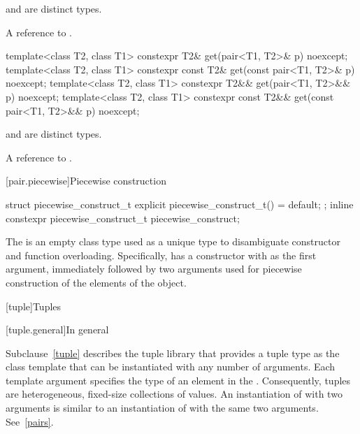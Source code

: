 \begin{itemdescr}
\pnum
\mandates
{} and  are distinct types.

\pnum
\returns
A reference to .
\end{itemdescr}

%
\begin{itemdecl}
template<class T2, class T1>
  constexpr T2& get(pair<T1, T2>& p) noexcept;
template<class T2, class T1>
  constexpr const T2& get(const pair<T1, T2>& p) noexcept;
template<class T2, class T1>
  constexpr T2&& get(pair<T1, T2>&& p) noexcept;
template<class T2, class T1>
  constexpr const T2&& get(const pair<T1, T2>&& p) noexcept;
\end{itemdecl}

\begin{itemdescr}
\pnum
\mandates
{} and  are distinct types.

\pnum
\returns
A reference to .
\end{itemdescr}

[pair.piecewise]{Piecewise construction}

%
%
\begin{itemdecl}
struct piecewise_construct_t {
  explicit piecewise_construct_t() = default;
};
inline constexpr piecewise_construct_t piecewise_construct{};
\end{itemdecl}

\pnum
The   is an empty class type
used as a unique type to disambiguate constructor and function overloading. Specifically,
 has a constructor with  as the
first argument, immediately followed by two  arguments used
for piecewise construction of the elements of the  object.

[tuple]{Tuples}

[tuple.general]{In general}

\pnum
{}%
Subclause~\ref{tuple} describes the tuple library that provides a tuple type as
the class template  that can be instantiated with any number
of arguments. Each template argument specifies
the type of an element in the .  Consequently, tuples are
heterogeneous, fixed-size collections of values. An instantiation of  with
two arguments is similar to an instantiation of  with the same two arguments.
See~\ref{pairs}.

